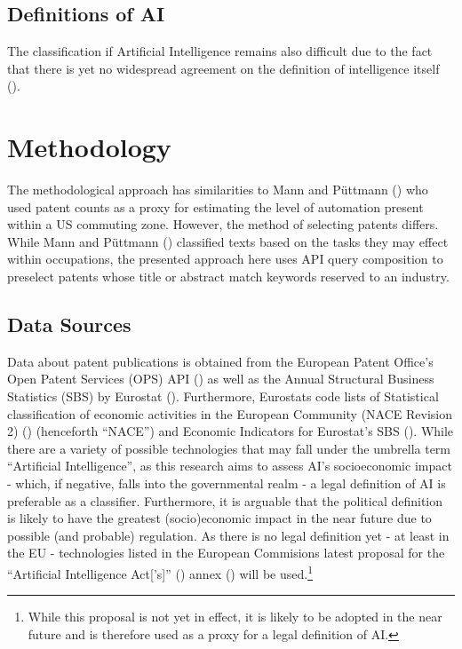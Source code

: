 \documentclass[
  11,
  a4paperpaper,
]{article}
\begin{document}
\subsection{Definitions of AI}\label{definitions-of-ai}

The classification if Artificial Intelligence remains also difficult due
to the fact that there is yet no widespread agreement on the definition
of intelligence itself ().

\section{Methodology}\label{methodology}

The methodological approach has similarities to Mann and Püttmann
() who used patent counts as
a proxy for estimating the level of automation present within a US
commuting zone. However, the method of selecting patents differs. While
Mann and Püttmann () classified
texts based on the tasks they may effect within occupations, the
presented approach here uses API query composition to preselect patents
whose title or abstract match keywords reserved to an industry.

\subsection{Data Sources}\label{data-sources}

Data about patent publications is obtained from the European Patent
Office's Open Patent Services (OPS) API
() as well as the Annual Structural Business Statistics (SBS) by
Eurostat ().
Furthermore, Eurostats code lists of Statistical classification of
economic activities in the European Community (NACE Revision 2)
() (henceforth
``NACE'') and Economic Indicators for Eurostat's SBS
(). While there
are a variety of possible technologies that may fall under the umbrella
term ``Artificial Intelligence'', as this research aims to assess AI's
socioeconomic impact - which, if negative, falls into the governmental
realm - a legal definition of AI is preferable as a classifier.
Furthermore, it is arguable that the political definition is likely to
have the greatest (socio)economic impact in the near future due to
possible (and probable) regulation. As there is no legal definition yet
- at least in the EU - technologies listed in the European Commisions
latest proposal for the ``Artificial Intelligence Act{[}'s{]}''
() annex () will be used.\footnote{While this proposal is not
  yet in effect, it is likely to be adopted in the near future and is
  therefore used as a proxy for a legal definition of AI.}
\end{document}
